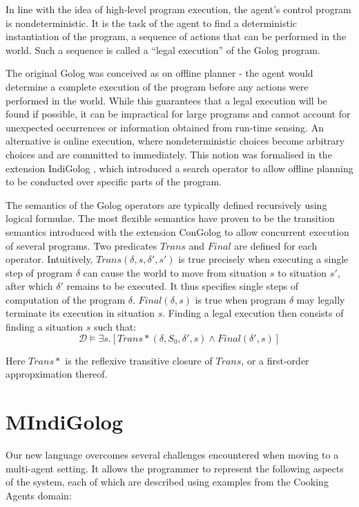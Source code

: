 \documentclass[letterpaper]{article}
\begin{document}
In line with the idea of high-level program execution, the agent's
control program is nondeterministic. It is the task of the agent to
find a deterministic instantiation of the program, a sequence of actions
that can be performed in the world. Such a sequence is called a ``legal
execution'' of the Golog program.

The original Golog was conceived as on offline planner - the agent
would determine a complete execution of the program before any actions
were performed in the world. While this guarantees that a legal execution
will be found if possible, it can be impractical for large programs
and cannot account for unexpected occurrences or information obtained
from run-time sensing. An alternative is online execution, where nondeterministic
choices become arbitrary choices and are committed to immediately.
This notion was formalised in the extension IndiGolog \cite{giacomo99indigolog},
which introduced a search operator to allow offline planning to be
conducted over specific parts of the program.

The semantics of the Golog operators are typically defined recursively
using logical formulae. The most flexible semantics have proven to
be the transition semantics introduced with the extension ConGolog
\cite{giacomo00congolog} to allow concurrent execution of several
programs. Two predicates $Trans$ and $Final$ are defined for each
operator. Intuitively, $Trans(\delta,s,\delta',s')$ is true precisely
when executing a single step of program $\delta$ can cause the world
to move from situation $s$ to situation $s'$, after which $\delta'$
remains to be executed. It thus specifies single steps of computation
of the program $\delta$. $Final(\delta,s)$ is true when program
$\delta$ may legally terminate its execution in situation $s$. Finding
a legal execution then consists of finding a situation $s$ such that:
\begin{equation}
\mathcal{D}\models\exists s.\left[Trans*(\delta,S_{0},\delta',s)\wedge Final(\delta',s)\right]
\end{equation}

Here $Trans*$ is the reflexive transitive closure of $Trans$, or a first-order
appropximation thereof.

\section{MIndiGolog}

\label{sec:Language-Features}

Our new language overcomes several challenges encountered when moving
to a multi-agent setting. It allows the programmer to represent the
following aspects of the system, each of which are described using
examples from the Cooking Agents domain:
\end{document}
